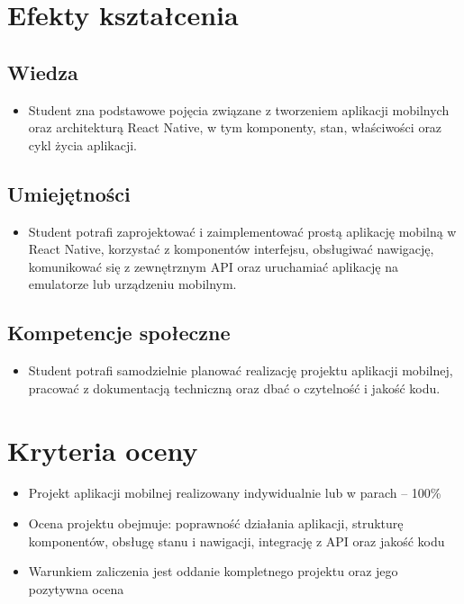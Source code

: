 \documentclass[12pt, a4paper]{article}
\begin{document}
\section{Efekty kształcenia}

\subsection*{Wiedza}
\begin{itemize}
  \item Student zna podstawowe pojęcia związane z tworzeniem aplikacji mobilnych oraz architekturą React Native, w tym komponenty, stan, właściwości oraz cykl życia aplikacji.
\end{itemize}

\subsection*{Umiejętności}
\begin{itemize}
  \item Student potrafi zaprojektować i zaimplementować prostą aplikację mobilną w React Native, korzystać z komponentów interfejsu, obsługiwać nawigację, komunikować się z zewnętrznym API oraz uruchamiać aplikację na emulatorze lub urządzeniu mobilnym.
\end{itemize}

\subsection*{Kompetencje społeczne}
\begin{itemize}
  \item Student potrafi samodzielnie planować realizację projektu aplikacji mobilnej, pracować z dokumentacją techniczną oraz dbać o czytelność i jakość kodu.
\end{itemize}

\section{Kryteria oceny}

\begin{itemize}
  \item Projekt aplikacji mobilnej realizowany indywidualnie lub w parach – 100\%
  \item Ocena projektu obejmuje: poprawność działania aplikacji, strukturę komponentów, obsługę stanu i nawigacji, integrację z API oraz jakość kodu
  \item Warunkiem zaliczenia jest oddanie kompletnego projektu oraz jego pozytywna ocena
\end{itemize}
\end{document}
